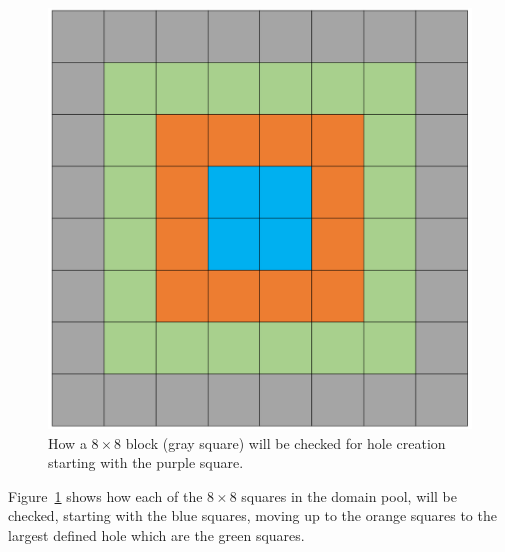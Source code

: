 \documentclass[10pt,twocolumn, a4paper]{witseiepaper}
\begin{document}
\begin{figure}[h!]
\renewcommand{\thefigure}{\arabic{figure}}
\centering
\includegraphics[scale=0.2]{Grid.png}
\caption{How a $8\times 8$ block (gray square) will be checked for hole creation starting with the purple square.}
\label{fig: Grid}
\end{figure}

Figure~\ref{fig: Grid} shows how each of the $8\times 8$ squares in the domain pool, will be checked, starting with the blue squares, moving up to the orange squares to the largest defined hole which are the green squares.
\end{document}
